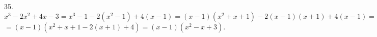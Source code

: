 35. $x^3-2x^2+4x-3=x^3-1-2(x^2-1)+4(x-1)=(x-1)(x^2+x+1)-2(x-1)(x+1)+4(x-1)=$\\$=(x-1)(x^2+x+1-2(x+1)+4)=
(x-1)(x^2-x+3).$\\
